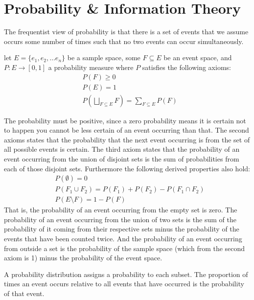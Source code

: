 \section{Probability \& Information Theory}
The frequentist view of probability is that there is a set of events that we assume occurs some number of times such that no two events can occur simultaneously. 
%
\begin{mydef}\label{prob}
let $E = \{ e_1, e_2, \ldots e_n \}$ be a sample space, some $F \subseteq E$ be an event space, and $P: E \rightarrow [0,1]$ a probability measure where $P$ satisfies the following axioms:
%
 \begin{align*}
  &P(F) \geq 0\\
  &P(E) = 1\\
  &P(\bigsqcup_{F \subseteq E} F) = \sum_{F \subseteq E} P(F)
 \end{align*}
%
\end{mydef} 
The probability must be positive, since a zero probability means it is certain not to happen you cannot be less certain of an event occurring than that.  The second axioms states that the probability that the next event occurring is from the set of all possible events is certain.  The third axiom states that the probability of an event occurring from the union of disjoint sets is the sum of probabilities from each of those disjoint sets. 
%
Furthermore the following derived properties also hold:
%
  \begin{align*}
  & P(\emptyset) = 0\\
  & P(F_1 \cup F_2) = P(F_1) + P(F_2) - P(F_1 \cap F_2)\\
  & P(E \setminus F) = 1 - P(F)
 \end{align*}
That is, the probability of an event occurring from the empty set is zero.  The probability of an event occurring from the union of two sets is the sum of  the probability of it coming from their respective sets minus the probability of the events that have been counted twice.  And the probability of an event occurring from outside a set is the probability of the sample space (which from the second axiom is 1) minus the probability of the event space.

A probability distribution assigns a probability to each subset.  
The proportion of times an event occurs relative to all events that have occurred is the probability of that event.

